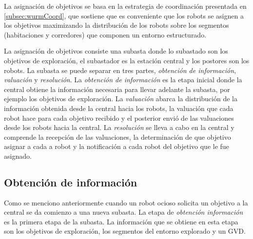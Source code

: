 La asignación de objetivos se basa en la estrategia de coordinación presentada
en \ref{subsec:wurmCoord}, que sostiene que es conveniente que los robots se
asignen a los objetivos maximizando la distribución de los robots
sobre los segmentos (habitaciones y corredores) que componen un entorno
estructurado.

La asignación de objetivos consiste una subasta donde lo subastado son los
objetivos de exploración, el subastador es la estación central y los postores
son los robots. La subasta se puede separar en tres partes, \emph{obtención de
  información}, \emph{valuación} y \emph{resolución}. La \emph{obtención de
información} es la etapa inicial donde la central obtiene la información necesaria
para llevar adelante la subasta, por ejemplo los objetivos de exploración. La
\emph{valuación} abarca la distribución de la información obtenida desde la
central hacia los robots, la valuación que cada robot hace para cada objetivo
recibido y el posterior envió de las valuaciones desde los robots hacia la
central. La \emph{resolución} se lleva a cabo en la central y comprende la
recepción de las valuaciones, la determinación de que objetivo asignar a cada a
robot y la notificación a cada robot del objetivo que le fue asignado.



\subsection{Obtención de información}\label{subsec:obtInfo}
Como se menciono anteriormente cuando un robot ocioso solicita un objetivo a la
central se da comienzo a una nueva subasta. La etapa de \emph{obtención
información} es la primera etapa de la subasta. La información que se obtiene
en esta etapa son los objetivos de exploración, los segmentos del entorno
explorado y un GVD.

